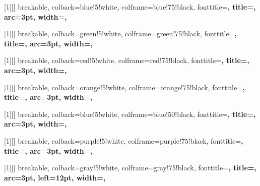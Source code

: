 [1][]{
    breakable,
    colback=blue!5!white,
    colframe=blue!75!black,
    fonttitle=\bfseries,
    title={}, 
    arc=3pt,  
    width=\linewidth,
}

[1][]{
    breakable, 
    colback=green!5!white,
    colframe=green!75!black,
    fonttitle=\bfseries,
    title={}, 
    arc=3pt,  
    width=\linewidth,
}

[1][]{
    breakable,
    colback=red!5!white,
    colframe=red!75!black,
    fonttitle=\bfseries,
    title={}, 
    arc=3pt,  
    width=\linewidth,
}

[1][]{
    breakable,
    colback=orange!5!white,
    colframe=orange!75!black,
    fonttitle=\bfseries,
    title={}, 
    arc=3pt,  
    width=\linewidth,
}

[1][]{
    breakable,
    colback=blue!5!white,      %
    colframe=blue!50!black,   %
    fonttitle=\bfseries,
    title={}, 
    arc=3pt,                  %
    width=\linewidth,
}

[1][]{
    breakable,
    colback=purple!5!white,      %
    colframe=purple!75!black,    %
    fonttitle=\bfseries,
    title={}, %
    arc=3pt,                    %
    width=\linewidth,           %
}

[1][]{
    breakable,
    colback=gray!5!white,        %
    colframe=gray!75!black,      %
    fonttitle=\bfseries,
    title={}, %
    arc=3pt,
    left=12pt,
    width=\linewidth,
}